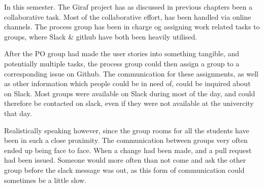 In this semester.
The Giraf project has as discussed in previous chapters been a collaborative task.
Most of the collaborative effort, has been handled via online channels.
The process group has been in charge og assigning work related tasks to groups, where Slack \& github have both been heavily utilised.

After the PO group had made the user stories into something tangible, and potentially multiple tasks, the process group could then assign a group to a corresponding issue on Github.
The communication for these assignments, as well as other information which people could be in need of, could be inquired about on Slack.
Most groups were available on Slack during most of the day, and could therefore be contacted on slack, even if they were not available at the univercity that day.

Realistically speaking however, since the group rooms for all the students have been in such a close proximity. The communication between groups very often ended up being face to face.
When a change had been made, and a pull request had been issued.
Someone would more often than not come and ask the other group before the slack message was out, as this form of communication could sometimes be a little slow.

